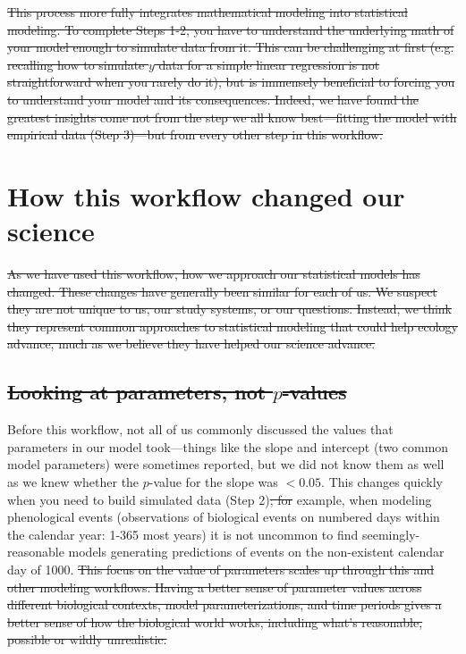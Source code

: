 \documentclass[11pt]{article}
\providecommand{\DIFaddtex}[1]{{\protect\color{blue}\uwave{#1}}} %
\providecommand{\DIFdeltex}[1]{{\protect\color{red}\sout{#1}}}                      %
\providecommand{\DIFaddbegin}{} %
\providecommand{\DIFaddend}{} %
\providecommand{\DIFdelbegin}{} %
\providecommand{\DIFdelend}{} %
\providecommand{\DIFadd}[1]{\texorpdfstring{\DIFaddtex{#1}}{#1}} %
\providecommand{\DIFdel}[1]{\texorpdfstring{\DIFdeltex{#1}}{}} %
\newcommand{\DIFscaledelfig}{0.5}
\newlength{\DIFdelgraphicswidth} %
\newlength{\DIFdelgraphicsheight} %
\newcommand{\DIFaddincludegraphics}[2][]{{\color{blue}\fbox{\DIFOincludegraphics[#1]{#2}}}} %
\newcommand{\DIFdelincludegraphics}[2][]{%
\sbox{\DIFdelgraphicsbox}{\DIFOincludegraphics[#1]{#2}}%
\settoboxwidth{\DIFdelgraphicswidth}{\DIFdelgraphicsbox} %
\settoboxtotalheight{\DIFdelgraphicsheight}{\DIFdelgraphicsbox} %
\scalebox{\DIFscaledelfig}{%
\parbox[b]{\DIFdelgraphicswidth}{\usebox{\DIFdelgraphicsbox}\\[-\baselineskip] \rule{\DIFdelgraphicswidth}{0em}}\llap{\resizebox{\DIFdelgraphicswidth}{\DIFdelgraphicsheight}{%
\setlength{\unitlength}{\DIFdelgraphicswidth}%
\begin{picture}(1,1)%
\thicklines\linethickness{2pt} %
{\color[rgb]{1,0,0}\put(0,0){\framebox(1,1){}}}%
{\color[rgb]{1,0,0}\put(0,0){\line( 1,1){1}}}%
{\color[rgb]{1,0,0}\put(0,1){\line(1,-1){1}}}%
\end{picture}%
}\hspace*{3pt}}} %
} %
\DeclareRobustCommand{\DIFaddbegin}{\DIFOaddbegin \let\includegraphics\DIFaddincludegraphics} %
\DeclareRobustCommand{\DIFaddend}{\DIFOaddend \let\includegraphics\DIFOincludegraphics} %
\DeclareRobustCommand{\DIFdelbegin}{\DIFOdelbegin \let\includegraphics\DIFdelincludegraphics} %
\DeclareRobustCommand{\DIFdelend}{\DIFOaddend \let\includegraphics\DIFOincludegraphics} %
\begin{document}
\DIFdelbegin \DIFdel{This process more fully integrates mathematical modeling into statistical modeling. To complete Steps 1-2, you have to understand the underlying math of your model enough to simulate data from it. This can be challenging at first (e.g. recalling how to simulate $y$ data for a simple linear regression is not straightforward when you rarely do it), but is immensely beneficial to forcing you to understand your model and its consequences. Indeed, we have found the greatest insights come not from the step we all know best---fitting the model with empirical data (Step 3)---but from every other step in this workflow. 
}%

\DIFdelend \section*{How this workflow changed our science} 
\DIFdelbegin %

\DIFdel{As we have used this workflow, how we approach our statistical models has changed. These changes have generally been similar for each of us. We suspect they are not unique to us, our study systems, or our questions. Instead, we think they represent common approaches to statistical modeling that could help ecology advance, much as we believe they have helped our science advance. 
}%

\subsection*{\DIFdel{Looking at parameters, not $p$-values}} 
\DIFdelend Before this workflow, not all of us commonly discussed the values that parameters in our model took---things like the slope and intercept (two common model parameters) were sometimes reported, but we did not know them as well as we knew whether the $p$-value for the slope was $<0.05$. This changes quickly when you need to build simulated data (Step 2)\DIFdelbegin \DIFdel{; for }\DIFdelend \DIFaddbegin \DIFadd{. For }\DIFaddend example, when modeling phenological events (observations of biological events on numbered days within the calendar year: 1-365 most years) it is not uncommon to find seemingly-reasonable models generating predictions of events on the non-existent calendar day of 1000. \DIFdelbegin \DIFdel{This focus on the value of parameters scales up through this and other modeling workflows. Having a better sense of parameter values across different biological contexts, model parameterizations, and time periods gives a better sense of how the biological world works, including what's reasonable, possible or wildly unrealistic. 
}\DIFdelend %
\end{document}
